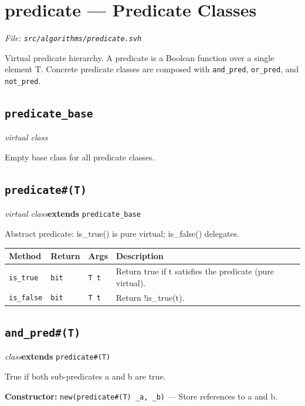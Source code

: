 \documentclass[11pt,letterpaper]{report}
\begin{document}
\section{predicate --- Predicate Classes}
\noindent\small\textit{File: \texttt{src/algorithms/predicate.svh}}\par

Virtual predicate hierarchy. A predicate is a Boolean function over a single element T. Concrete predicate classes are composed with \texttt{and\_pred}, \texttt{or\_pred}, and \texttt{not\_pred}.

\subsection*{\texttt{predicate\_base}}
\noindent\small\textit{virtual class}\par

Empty base class for all predicate classes.


\subsection*{\texttt{predicate\#(T)}}
\noindent\small\textit{virtual class}\quad \textbf{extends} \texttt{predicate\_base}\par

Abstract predicate: is\_true() is pure virtual; is\_false() delegates.

\begin{xltabular}{\linewidth}{>{\small}p{1.35in} >{\small}p{1.25in} >{\small}p{0.95in} >{\small}X}
\toprule
\textbf{Method} & \textbf{Return} & \textbf{Args} & \textbf{Description} \\
\midrule
\endhead
\bottomrule
\endfoot
\texttt{is\_true} & \texttt{bit} & \texttt{T t} & Return true if t satisfies the predicate (pure virtual). \\
\texttt{is\_false} & \texttt{bit} & \texttt{T t} & Return !is\_true(t). \\
\end{xltabular}

\subsection*{\texttt{and\_pred\#(T)}}
\noindent\small\textit{class}\quad \textbf{extends} \texttt{predicate\#(T)}\par

True if both sub-predicates a and b are true.

\noindent\textbf{Constructor:} \texttt{new(predicate\#(T) \_a, \_b)} --- Store references to a and b.
\end{document}
